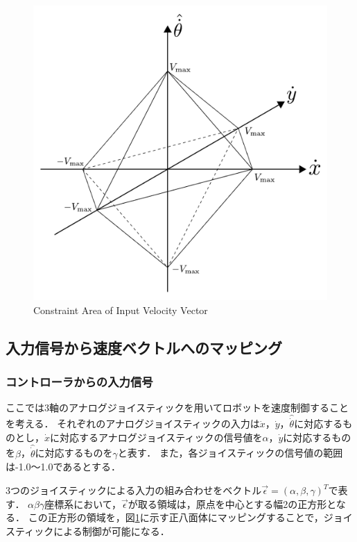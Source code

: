 \begin{figure}[h]
  \centering
  \includegraphics[width=80truemm, clip]{images/constraint.pdf}
  \caption{Constraint Area of Input Velocity Vector}
  \label{fig:constraint}
\end{figure}

\subsection{入力信号から速度ベクトルへのマッピング}

\subsubsection{コントローラからの入力信号}

ここでは3軸のアナログジョイスティックを用いてロボットを速度制御することを考える．
それぞれのアナログジョイスティックの入力は$\dot{x}$，$\dot{y}$，$\hat{\dot{\theta}}$に対応するものとし，$\dot{x}$に対応するアナログジョイスティックの信号値を$\alpha$，$\dot{y}$に対応するものを$\beta$，$\hat{\dot{\theta}}$に対応するものを$\gamma$と表す．
また，各ジョイスティックの信号値の範囲は-1.0～1.0であるとする．

3つのジョイスティックによる入力の組み合わせをベクトル$\vec{\epsilon} = (\alpha, \beta, \gamma)^T$で表す．
$\alpha\beta\gamma$座標系において，$\vec{\epsilon}$が取る領域は，原点を中心とする幅2の正方形となる．
この正方形の領域を，図\ref{fig:constraint}に示す正八面体にマッピングすることで，ジョイスティックによる制御が可能になる．

